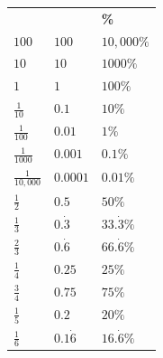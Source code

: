 \documentclass[9pt]{article}
\newcommand{\ealtext}[1]{\foreignlanguage{polish}{#1}}
\newlength{\ealglosswd}
\newlength{\ealglossraise}
\newcommand{\ealkey}[1]{\textcolor{ealkeycolour}{#1}}
\newcommand{\ealgloss}[2]{%
  \sbox{\ealboxen}{\ealkey{#1}}%
  \sbox{\ealboxtr}{\small\textcolor{ealtwocolour}{\ealtext{#2}}}%
  \setlength{\ealglosswd}{\wd\ealboxen}%
  \ifdim\wd\ealboxtr>\ealglosswd\setlength{\ealglosswd}{\wd\ealboxtr}\fi
  \leavevmode
  \makebox[\ealglosswd][c]{%
    \makebox[0pt][c]{\usebox{\ealboxen}}%
    \makebox[0pt][c]{\raisebox{\ealglossraise}{\usebox{\ealboxtr}}}%
  }%
}
\newenvironment{ealglossed}{\par\linespread{2.1}\selectfont\ignorespaces}{\par}
\begin{document}
\begin{ealglossed}
\end{ealglossed}

\vspace{1pt}

\begin{ealglossed}
\noindent
\begin{minipage}[t]{0.18\linewidth}
\vspace{0pt}
\noindent\colorbox{TitleBg}{}
\par\vspace{2pt}
\renewcommand{\arraystretch}{2.0}
{\scriptsize\setlength{\tabcolsep}{2pt}
\begin{tabular}{
  >{\bfseries\centering\arraybackslash}p{1.1cm}
  >{\bfseries\centering\arraybackslash}p{1.1cm}
  >{\bfseries\centering\arraybackslash}p{1.1cm}
}
\rowcolor{RowAlt}
\ealgloss{Fraction}{ułamek} & \ealgloss{Decimal}{ułamek dziesiętny} & \% \\
$100$  & $100$       & $10,000\%$         \\
$10$  & $10$       & $1000\%$         \\
$1$  & $1$       & $100\%$         \\
$\tfrac{1}{10}$  & $0.1$      & $10\%$         \\
$\tfrac{1}{100}$  & $0.01$      & $1\%$         \\
$\tfrac{1}{1000}$  & $0.001$       & $0.1\%$         \\
$\tfrac{1}{10,000}$  & $0.0001$       & $0.01\%$         \\
$\tfrac{1}{2}$  & $0.5$       & $50\%$         \\
$\tfrac{1}{3}$  & $0.\dot{3}$       & $33.\dot{3}\%$         \\
$\tfrac{2}{3}$  & $0.\dot{6}$       & $66.\dot{6}\%$         \\
$\tfrac{1}{4}$  & $0.25$       & $25\%$         \\
$\tfrac{3}{4}$  & $0.75$     & $75\%$       \\
$\tfrac{1}{5}$  & $0.2$     & $20\%$       \\
$\tfrac{1}{6}$  & $0.1\dot{6}$     & $16.\dot{6}\%$       \\

\end{tabular}}
\end{minipage}
\end{ealglossed}
\end{document}
